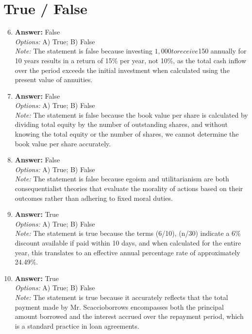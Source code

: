 \documentclass[12pt]{article}
\begin{document}
\section*{True / False}
\begin{enumerate}[label=\arabic*.]
\setcounter{enumi}{5}
\item \textbf{Answer:} False
\\ \textit{Options:} A) True; B) False
\\ \textit{Note:} The statement is false because investing $1,000 to receive $150 annually for 10 years results in a return of 15\% per year, not 10\%, as the total cash inflow over the period exceeds the initial investment when calculated using the present value of annuities.
\item \textbf{Answer:} False
\\ \textit{Options:} A) True; B) False
\\ \textit{Note:} The statement is false because the book value per share is calculated by dividing total equity by the number of outstanding shares, and without knowing the total equity or the number of shares, we cannot determine the book value per share accurately.
\item \textbf{Answer:} False
\\ \textit{Options:} A) True; B) False
\\ \textit{Note:} The statement is false because egoism and utilitarianism are both consequentialist theories that evaluate the morality of actions based on their outcomes rather than adhering to fixed moral duties.
\item \textbf{Answer:} True
\\ \textit{Options:} A) True; B) False
\\ \textit{Note:} The statement is true because the terms (6/10), (n/30) indicate a 6\% discount available if paid within 10 days, and when calculated for the entire year, this translates to an effective annual percentage rate of approximately 24.49\%.
\item \textbf{Answer:} True
\\ \textit{Options:} A) True; B) False
\\ \textit{Note:} The statement is true because it accurately reflects that the total payment made by Mr. Scaccioborrows encompasses both the principal amount borrowed and the interest accrued over the repayment period, which is a standard practice in loan agreements.
\end{enumerate}
\end{document}
